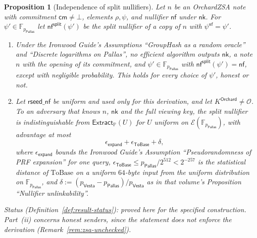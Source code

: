 \documentclass[11pt,a4paper]{article}
\newtheorem{proposition}[theorem]{Proposition}
\theoremstyle{definition}
\newcommand{\F}{\mathbb{F}}
\newcommand{\PP}{\mathbb{P}}
\newcommand{\nfsym}{\mathsf{nf}}
\newcommand{\cmsym}{\mathsf{cm}}
\newcommand{\Pallas}{\ensuremath{\mathsf{Pallas}}}
\newcommand{\Vesta}{\ensuremath{\mathsf{Vesta}}}
\newcommand{\Ep}{\ensuremath{\mathcal{E}}}
\newcommand{\Extract}{\ensuremath{\mathsf{Extract}}}
\newcommand{\nksym}{\ensuremath{\mathsf{nk}}}
\begin{document}
\begin{proposition}[Independence of split nullifiers]\label{prop:split-nf}
Let $n$ be an OrchardZSA note with commitment $\cmsym \neq \bot$, elements
$\rho, \psi$, and nullifier $\nfsym$ under $\nksym$. For
$\psi' \in \F_{p_{\Pallas}}$ let $\nfsym^{\mathsf{split}}(\psi')$ be the
split nullifier of a copy of $n$ with $\psi^{\mathsf{nf}} = \psi'$.
\begin{enumerate}
\item[(i)] Under the \emph{Ironwood Guide}'s Assumptions ``GroupHash as a
  random oracle'' and ``Discrete logarithms on Pallas'', no efficient
  algorithm outputs $\nksym$, a note $n$ with the opening of its commitment,
  and $\psi' \in \F_{p_{\Pallas}}$ with $\nfsym^{\mathsf{split}}(\psi') =
  \nfsym$, except with negligible probability. This holds for every choice
  of $\psi'$, honest or not.
\item[(ii)] Let $\mathsf{rseed\_nf}$ be uniform and used only for this
  derivation, and let $K^{\mathsf{Orchard}} \neq \mathcal{O}$. To an
  adversary that knows $n$, $\nksym$ and the full viewing key, the split
  nullifier is indistinguishable from $\Extract_{\PP}(U)$ for $U$ uniform on
  $\Ep(\F_{p_{\Pallas}})$, with advantage at most
  \[
    \epsilon_{\mathsf{expand}} + \epsilon_{\mathsf{ToBase}} + \delta,
  \]
  where $\epsilon_{\mathsf{expand}}$ bounds the \emph{Ironwood Guide}'s
  Assumption ``Pseudorandomness of PRF expansion'' for one query,
  $\epsilon_{\mathsf{ToBase}} \le p_{\Pallas}/2^{512} < 2^{-257}$ is the
  statistical distance of $\mathrm{ToBase}$ on a uniform $64$-byte input
  from the uniform distribution on $\F_{p_{\Pallas}}$, and
  $\delta := (p_{\Vesta} - p_{\Pallas})/p_{\Vesta}$ as in that volume's
  Proposition ``Nullifier unlinkability''.
\end{enumerate}
Status (Definition~\ref{def:result-status}): proved here for the specified
construction. Part~(ii) concerns honest senders, since the statement does
not enforce the derivation (Remark~\ref{rem:zsa-unchecked}).
\end{proposition}
\end{document}
